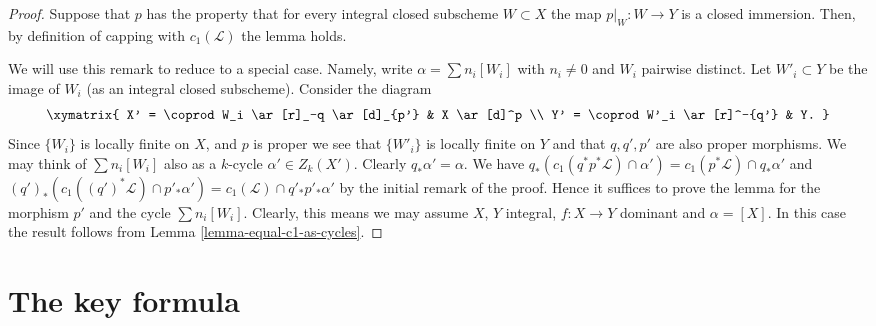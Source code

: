 \begin{proof}
Suppose that $p$ has the property that for every integral
closed subscheme $W \subset X$ the map $p|_W : W \to Y$
is a closed immersion. Then, by definition of capping
with $c_1(\mathcal{L})$ the lemma holds.

\medskip\noindent
We will use this remark to reduce to a special case. Namely,
write $\alpha = \sum n_i[W_i]$ with $n_i \not = 0$ and $W_i$ pairwise
distinct. Let $W'_i \subset Y$ be the image of $W_i$ (as an integral
closed subscheme). Consider the diagram
$$
\xymatrix{
X' = \coprod W_i \ar[r]_-q \ar[d]_{p'} & X \ar[d]^p \\
Y' = \coprod W'_i \ar[r]^-{q'} & Y.
}
$$
Since $\{W_i\}$ is locally finite on $X$, and $p$ is proper
we see that $\{W'_i\}$ is locally finite on $Y$ and that
$q, q', p'$ are also proper morphisms.
We may think of $\sum n_i[W_i]$ also as a $k$-cycle
$\alpha' \in Z_k(X')$. Clearly $q_*\alpha' = \alpha$.
We have
$q_*(c_1(q^*p^*\mathcal{L}) \cap \alpha')
= c_1(p^*\mathcal{L}) \cap q_*\alpha'$
and
$(q')_*(c_1((q')^*\mathcal{L}) \cap p'_*\alpha') =
c_1(\mathcal{L}) \cap q'_*p'_*\alpha'$ by the initial
remark of the proof. Hence it suffices to prove the lemma
for the morphism $p'$ and the cycle $\sum n_i[W_i]$.
Clearly, this means we may assume $X$, $Y$ integral,
$f : X \to Y$ dominant and $\alpha = [X]$.
In this case the result follows from
Lemma \ref{lemma-equal-c1-as-cycles}.
\end{proof}






\section{The key formula}
\label{section-key}

